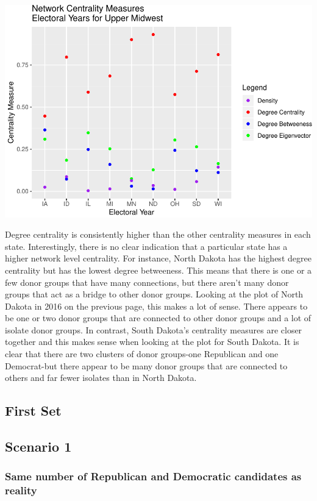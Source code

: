 \documentclass[]{article}
\begin{document}
\includegraphics{Final_Project_RMarkdown_Updated_files/figure-latex/unnamed-chunk-13-1.pdf}

Degree centrality is consistently higher than the other centrality
measures in each state. Interestingly, there is no clear indication that
a particular state has a higher network level centrality. For instance,
North Dakota has the highest degree centrality but has the lowest degree
betweeness. This means that there is one or a few donor groups that have
many connections, but there aren't many donor groups that act as a
bridge to other donor groups. Looking at the plot of North Dakota in
2016 on the previous page, this makes a lot of sense. There appears to
be one or two donor groups that are connected to other donor groups and
a lot of isolate donor groups. In contrast, South Dakota's centrality
measures are closer together and this makes sense when looking at the
plot for South Dakota. It is clear that there are two clusters of donor
groups-one Republican and one Democrat-but there appear to be many donor
groups that are connected to others and far fewer isolates than in North
Dakota.

\subsection{First Set}\label{first-set-1}

\subsection{Scenario 1}\label{scenario-1}

\subsubsection{Same number of Republican and Democratic candidates as
reality}\label{same-number-of-republican-and-democratic-candidates-as-reality}
\end{document}

